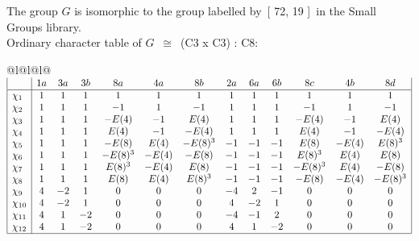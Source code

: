 \documentclass[varwidth=\maxdimen,border=10]{standalone}
\begin{document}
The group $G$ is isomorphic to the group labelled by\ [ 72, 19 ]\ in the Small Groups library.\\
Ordinary character table of $G$\ $\cong$\ (C3 x C3) : C8:\\
\begin{center}
\begin{tabular}{@{}l@{}l@{}l@{}}
\hline
\(\begin{array}{|l|cccccccccccc|}
  & 1a & 3a & 3b & 8a & 4a & 8b & 2a & 6a & 6b & 8c & 4b & 8d\\ \hline
\chi_{1} & 1 & 1 & 1 & 1 & 1 & 1 & 1 & 1 & 1 & 1 & 1 & 1\\
\chi_{2} & 1 & 1 & 1 & -1 & 1 & -1 & 1 & 1 & 1 & -1 & 1 & -1\\
\chi_{3} & 1 & 1 & 1 & -E(4) & -1 & E(4) & 1 & 1 & 1 & -E(4) & -1 & E(4)\\
\chi_{4} & 1 & 1 & 1 & E(4) & -1 & -E(4) & 1 & 1 & 1 & E(4) & -1 & -E(4)\\
\chi_{5} & 1 & 1 & 1 & -E(8) & E(4) & -E(8)^{3} & -1 & -1 & -1 & E(8) & -E(4) & E(8)^{3}\\
\chi_{6} & 1 & 1 & 1 & -E(8)^{3} & -E(4) & -E(8) & -1 & -1 & -1 & E(8)^{3} & E(4) & E(8)\\
\chi_{7} & 1 & 1 & 1 & E(8)^{3} & -E(4) & E(8) & -1 & -1 & -1 & -E(8)^{3} & E(4) & -E(8)\\
\chi_{8} & 1 & 1 & 1 & E(8) & E(4) & E(8)^{3} & -1 & -1 & -1 & -E(8) & -E(4) & -E(8)^{3}\\
\chi_{9} & 4 & -2 & 1 & 0 & 0 & 0 & -4 & 2 & -1 & 0 & 0 & 0\\
\chi_{10} & 4 & -2 & 1 & 0 & 0 & 0 & 4 & -2 & 1 & 0 & 0 & 0\\
\chi_{11} & 4 & 1 & -2 & 0 & 0 & 0 & -4 & -1 & 2 & 0 & 0 & 0\\
\chi_{12} & 4 & 1 & -2 & 0 & 0 & 0 & 4 & 1 & -2 & 0 & 0 & 0\\
\hline
\end{array}\)\\
\end{tabular}
\end{center}
\end{document}
